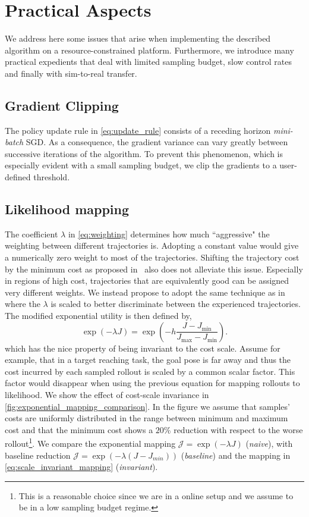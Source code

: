 \section{Practical Aspects} \label{sec:practical_aspects}

We address here some issues that arise when implementing the described algorithm on a resource-constrained platform. Furthermore, we introduce many practical expedients that deal with limited sampling budget, slow control rates and finally with sim-to-real transfer.  

\subsection{Gradient Clipping} 
The policy update rule in \eqref{eq:update_rule} consists of a receding horizon \emph{mini-batch} SGD. As a consequence, the gradient variance can vary greatly between successive iterations of the algorithm. To prevent this phenomenon, which is especially evident with a small sampling budget, we clip the gradients to a user-defined threshold.  

\subsection{Likelihood mapping} 
The coefficient $\lambda$ in \eqref{eq:weighting} determines how much ``aggressive" the weighting between different trajectories is. Adopting a constant value would give a numerically zero weight to most of the trajectories. Shifting the trajectory cost by the minimum cost as proposed in~\cite{williams_information_2017} also does not alleviate this issue. 
Especially in regions of high cost, trajectories that are equivalently good can be assigned very different weights. We instead propose to adopt the same technique as in~\cite{theodorou2010generalized} where the $\lambda$ is scaled to better discriminate between the experienced trajectories. The modified exponential utility is then defined by,
\begin{equation} \label{eq:scale_invariant_mapping}
    \exp (-\lambda J ) = \exp \left( -h \frac{J - J_{\min}}{J_{\max} - J_{\min}} \right).
\end{equation}
which has the nice property of being invariant to the cost scale. Assume for example, that in a target reaching task, the goal pose is far away and thus the cost incurred by each sampled rollout is scaled by a common scalar factor. This factor would disappear when using the previous equation for mapping rollouts to likelihood. We show the effect of cost-scale invariance in \fig \ref{fig:exponential_mapping_comparison}. In the figure we assume that samples' costs are uniformly distributed in the range between minimum and maximum cost and that the minimum cost shows a $20$\% reduction with respect to the worse rollout\footnote{This is a reasonable choice since we are in a online setup and we assume to be in a low sampling budget regime.}. We compare the exponential mapping $\mathcal{J} = \exp(-\lambda J)$ (\textit{naive}), with baseline reduction $\mathcal{J} = \exp(-\lambda (J - J_{min}))$ (\textit{baseline}) and the mapping in \eqref{eq:scale_invariant_mapping} (\textit{invariant}).

